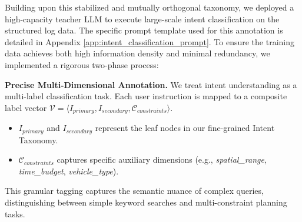 Building upon this stabilized and mutually orthogonal taxonomy, we deployed a high-capacity teacher LLM to execute large-scale intent classification on the structured log data. The specific prompt template used for this annotation is detailed in Appendix \ref{app:intent_classification_prompt}. To ensure the training data achieves both high information density and minimal redundancy, we implemented a rigorous two-phase process:

\textbf{Precise Multi-Dimensional Annotation.} We treat intent understanding as a multi-label classification task. Each user instruction is mapped to a composite label vector $\mathcal{V} = \langle I_{primary}, I_{secondary}, \mathcal{C}_{constraints} \rangle$.

\begin{itemize}
\item $I_{primary}$ and $I_{secondary}$ represent the leaf nodes in our fine-grained Intent Taxonomy.

\item $\mathcal{C}_{constraints}$ captures specific auxiliary dimensions (e.g., \textit{spatial\_range}, \textit{time\_budget}, \textit{vehicle\_type}).

\end{itemize}

This granular tagging captures the semantic nuance of complex queries, distinguishing between simple keyword searches and multi-constraint planning tasks.

